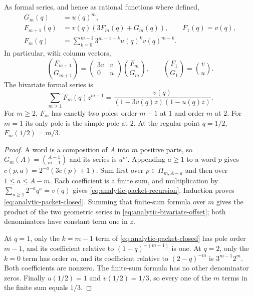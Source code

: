\begin{proposition}
\label{prop:packet-total-offset-series}
As formal series, and hence as rational functions where defined,
\begin{align}
 G_m(q)&=u(q)^m,\label{eq:analytic-packet-cardinality}\\
 F_{m+1}(q)&=v(q)(3F_m(q)+G_m(q)),\qquad F_1(q)=v(q),
 \label{eq:analytic-packet-recursion}\\
 F_m(q)&=\sum_{k=0}^{m-1}3^{m-1-k}u(q)^k v(q)^{m-k}.
 \label{eq:analytic-packet-closed}
\end{align}
In particular, with column vectors,
\[
 \binom{F_{m+1}}{G_{m+1}}
 =\begin{pmatrix}3v&v\\0&u\end{pmatrix}\binom{F_m}{G_m},
 \qquad \binom{F_1}{G_1}=\binom vu.
\]
The bivariate formal series is
\begin{equation}\label{eq:analytic-bivariate-offset}
 \sum_{m\ge1}F_m(q)z^{m-1}
 =\frac{v(q)}{(1-3v(q)z)(1-u(q)z)}.
\end{equation}
For $m\ge2$, $F_m$ has exactly two poles: order $m-1$ at $1$ and
order $m$ at $2$.  For $m=1$ its only pole is the simple pole at $2$.
At the regular point $q=1/2$, $F_m(1/2)=m/3$.
\end{proposition}
\begin{proof}
A word is a composition of $A$ into $m$ positive parts, so
$G_m(A)=\binom{A-1}{m-1}$ and its series is $u^m$.  Appending $a\ge1$
to a word $p$ gives $c(p,a)=2^{-a}(3c(p)+1)$.  Sum first over
$p\in\Pi_{m,A-a}$ and then over $1\le a\le A-m$.  Each coefficient
is a finite sum, and multiplication by $\sum_{a\ge1}2^{-a}q^a=v(q)$
gives \eqref{eq:analytic-packet-recursion}.  Induction proves
\eqref{eq:analytic-packet-closed}.  Summing that finite-sum formula over
$m$ gives the product of the two geometric series in
\eqref{eq:analytic-bivariate-offset}; both denominators have constant
term one in $z$.

At $q=1$, only the $k=m-1$ term of \eqref{eq:analytic-packet-closed}
has pole order $m-1$, and its coefficient relative to
$(1-q)^{-(m-1)}$ is one.  At $q=2$, only the $k=0$ term has order
$m$, and its coefficient relative to $(2-q)^{-m}$ is
$3^{m-1}2^m$.  Both coefficients are nonzero.  The finite-sum formula
has no other denominator zeros.
Finally $u(1/2)=1$ and $v(1/2)=1/3$, so every one of the $m$ terms
in the finite sum equals $1/3$.
\end{proof}

